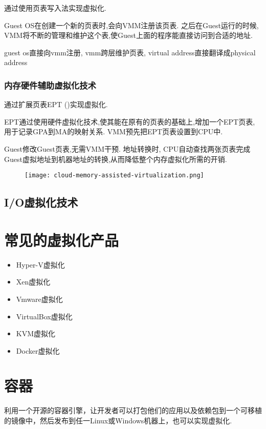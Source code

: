通过使用页表写入法实现虚拟化.

Guest OS在创建一个新的页表时,会向VMM注册该页表. 之后在Guest运行的时候, VMM将不断的管理和维护这个表,使Guest上面的程序能直接访问到合适的地址. 

guest os直接向vmm注册, vmm跨层维护页表, virtual address直接翻译成physical address

\subsubsection{内存硬件辅助虚拟化技术}

通过扩展页表EPT ()实现虚拟化. 

EPT通过使用硬件虚拟化技术,使其能在原有的页表的基础上,增加一个EPT页表,用于记录GPA到MA的映射关系. VMM预先把EPT页表设置到CPU中. 

Guest修改Guest页表,无需VMM干预. 地址转换时, CPU自动查找两张页表完成Guest虚拟地址到机器地址的转换,从而降低整个内存虚拟化所需的开销. 

\begin{figure}[htbp]
    \begin{center}
        \texttt{[image: cloud-memory-assisted-virtualization.png]}
    \end{center}
\end{figure}

\subsection{I/O虚拟化技术}


\section{常见的虚拟化产品}

\begin{itemize}
    \item Hyper-V虚拟化
    \item Xen虚拟化
    \item Vmware虚拟化
    \item VirtualBox虚拟化
    \item KVM虚拟化
    \item Docker虚拟化
\end{itemize}


\section{容器}

\begin{definition}[容器]
    利用一个开源的容器引擎，让开发者可以打包他们的应用以及依赖包到一个可移植的镜像中，然后发布到任一Linux或Windows机器上，也可以实现虚拟化. 
\end{definition}

